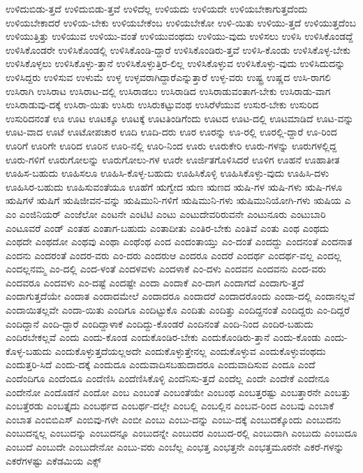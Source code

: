 {ಉಳಿದುಬಿಡು-ತ್ತದೆ
ಉಳಿದುಬಿಡು-ತ್ತವೆ
ಉಳಿದೆಲ್ಲ
ಉಳಿಯದು
ಉಳಿಯದೇ
ಉಳಿಯಬೇಕಾಗುತ್ತದೆಂದು
ಉಳಿಯಬೇಕಾದರೆ
ಉಳಿಯ-ಬೇಕು
ಉಳಿಯಬೇಕೆಂಬ
ಉಳಿಯಬೇಕೋ
ಉಳಿ-ಯಿತು
ಉಳಿಯು-ತ್ತದೆ
ಉಳಿಯುತ್ತದೆಂಬ
ಉಳಿಯುತ್ತಿತ್ತು
ಉಳಿಯುವ
ಉಳಿಯು-ವಂತೆ
ಉಳಿಯುವಂಥದು
ಉಳಿಯು-ವುದು
ಉಳಿಸಲು
ಉಳಿಸಿ
ಉಳಿಸಿಕೊಂಡದ್ದೆ
ಉಳಿಸಿಕೊಂಡರೇ
ಉಳಿಸಿಕೊಂಡಲ್ಲಿ
ಉಳಿಸಿಕೊಂಡಿ-ದ್ದಾರೆ
ಉಳಿಸಿಕೊಂಡಿರು-ತ್ತವೆ
ಉಳಿಸಿ-ಕೊಂಡು
ಉಳಿಸಿಕೊಳ್ಳ-ಬೇಕು
ಉಳಿಸಿಕೊಳ್ಳಲು
ಉಳಿಸಿಕೊಳ್ಳು-ತ್ತಾನೆ
ಉಳಿಸಿಕೊಳ್ಳುತ್ತಿರ-ಲಿಲ್ಲ
ಉಳಿಸಿಕೊಳ್ಳುವ
ಉಳಿಸಿಕೊಳ್ಳು-ವುದು
ಉಳಿಸಿದುದನ್ನು
ಉಳಿಸಿದ್ದರು
ಉಳಿಸುವ
ಉಳುಮೆ
ಉಳ್ಳ
ಉಳ್ಳವರಾಗಿದ್ದಾರೆಎನ್ನುತ್ತಾರೆ
ಉಳ್ಳ-ವರು
ಉಷ್ಟ್ರ
ಉಷ್ಣದ
ಉಸಿ-ರಾಗಲಿ
ಉಸಿರಾಗಿ
ಉಸಿರಾಟ
ಉಸಿರಾಟ-ದಲ್ಲಿ
ಉಸಿರಾಡಲು
ಉಸಿರಾಡಿದ
ಉಸಿರಾಡುವಂತಾಗ-ಬೇಕು
ಉಸಿರಾಡು-ವಾಗ
ಉಸಿರಾಡುವು-ದಕ್ಕೆ
ಉಸಿರಾ-ಯಿತು
ಉಸಿರು
ಉಸಿರುಕಟ್ಟುವಂಥ
ಉಸಿರೆಳೆಯುವ
ಉಸುರ-ಬೇಕು
ಉಸುರಿದ
ಉಸುರಿದನಂತೆ
ಊ
ಊಟ
ಊಟಕ್ಕೂ
ಊಟಕ್ಕೆ
ಊಟತಿಂಡಿಗೆಂದು
ಊಟದ
ಊಟ-ದಲ್ಲಿ
ಊಟಮಾಡಿದೆ
ಊಟ-ವನ್ನು
ಊಟ-ವಾದ
ಊಟೆ
ಊಟೋಪಚಾರ
ಊದಿ
ಊದಿ-ದರು
ಊರ
ಊರನ್ನು
ಊ-ರಲ್ಲಿ
ಊರಲ್ಲಿ-ದ್ದಾರೆ
ಊ-ರಿಂದ
ಊರಿಗೆ
ಊರಿಗೇ
ಊರಿದ
ಊರಿನ
ಊರಿ-ನಲ್ಲಿ
ಊರಿ-ನಿಂದ
ಊರು
ಊರುಕೇರಿ
ಊರು-ಗಳನ್ನು
ಊರುಗಳಲ್ಲಿದ್ದ
ಊರು-ಗಳಿಗೆ
ಊರುಗೋಲನ್ನು
ಊರುಗೋಲು-ಗಳ
ಊರೇ
ಊರ್ಜಿತಗೊಳಿಸಿದರೆ
ಊಳಿಗ
ಊಹನೆ
ಊಹಾತೀತ
ಊಹಿಸ-ಬಹುದು
ಊಹಿಸಲೂ
ಊಹಿಸಿ-ಕೊಳ್ಳ-ಬಹುದು
ಊಹಿಸಿಕೊಳ್ಳಿ
ಊಹಿಸಿಕೊಳ್ಳು-ವುದು
ಊಹಿಸಿ-ದಳು
ಊಹಿಸಿರ-ಬಹುದು
ಊಹಿಸುವಂತೆಯೂ
ಊಹೆಗೆ
ಋಗ್ವೇದ
ಋಣ
ಋಣದ
ಋಷಿ-ಗಳ
ಋಷಿ-ಗಳು
ಋಷಿ-ಗಳೂ
ಋಷಿಗಳೆ
ಋಷಿಗೆ
ಋಷಿಜೀವನ-ವನ್ನು
ಋಷಿಮುನಿ-ಗಳಿಗೆ
ಋಷಿಮುನಿ-ಗಳು
ಋಷಿಮುನಿಯೋಗಿ-ಗಳು
ಋಷಿಯ
ಎ
ಎಂ
ಎಂಜಿನಿಯರ್
ಎಂಜೆಲೋ
ಎಂಟನೇ
ಎಂಟಿಟಿ
ಎಂಟು
ಎಂಟುದೇವರಿರುವನೇ
ಎಂಟುನೂರು
ಎಂಟುಬಾರಿ
ಎಂಟೂವರೆ
ಎಂಡ್
ಎಂತಹ
ಎಂತಾಗ-ಬಹುದು
ಎಂತಾದೀತು
ಎಂತಿರ-ಬೇಕು
ಎಂತಿವೆ
ಎಂತು
ಎಂಥ
ಎಂಥದು
ಎಂಥದೇ
ಎಂಥದೋ
ಎಂಥವು
ಎಂಥಾ
ಎಂಥೆಂಥ
ಎಂದ
ಎಂದಂತಾಯ್ತು
ಎಂ-ದಂತೆ
ಎಂದದ್ದು
ಎಂದನಂತೆ
ಎಂದನಾತ
ಎಂದನು
ಎಂದರಂತೆ
ಎಂದರ-ವರು
ಎಂ-ದರು
ಎಂದರುಆ
ಎಂದರೂ
ಎಂದರೆ
ಎಂದರ್ಥ
ಎಂದರ್ಥ-ವಲ್ಲ
ಎಂದಲ್ಲ
ಎಂದಲ್ಲನಮ್ಮ
ಎಂ-ದಲ್ಲಿ
ಎಂದ-ಳಂತೆ
ಎಂದಳವಳು
ಎಂದಳಾಕೆ
ಎಂ-ದಳು
ಎಂದವನ
ಎಂದವನು
ಎಂದ-ವರು
ಎಂದವರೂ
ಎಂದವಳು
ಎಂ-ದಷ್ಟೆ
ಎಂದಷ್ಟೇ
ಎಂದಾ
ಎಂದಾಕೆ
ಎಂ-ದಾಗ
ಎಂದಾಗದೆ
ಎಂದಾಗು-ತ್ತದೆ
ಎಂದಾಗುತ್ತದೆಯೇ
ಎಂದಾತ
ಎಂದಾದಮೇಲೆ
ಎಂದಾದರೂ
ಎಂದಾದರೆ
ಎಂದಾದರೊಂದು
ಎಂದಾ-ದಲ್ಲಿ
ಎಂದಾನಲ್ಲವೆ
ಎಂದಾಯಿತಲ್ಲವೇ
ಎಂದಾ-ಯಿತು
ಎಂದಿಗೂ
ಎಂದಿಟ್ಟುಕೊ
ಎಂದಿತು
ಎಂದಿತ್ತು
ಎಂದಿದ್ದನಂತೆ
ಎಂದಿದ್ದರು
ಎಂ-ದಿದ್ದರೆ
ಎಂದಿದ್ದಾನೆ
ಎಂದಿ-ದ್ದಾರೆ
ಎಂದಿದ್ದಾಳಾಕೆ
ಎಂದಿದ್ದು-ಕೊಂಡರೆ
ಎಂದಿನಂತೆ
ಎಂದಿ-ನಿಂದ
ಎಂದಿರ-ಬಹುದು
ಎಂದಿರಬೇಕಲ್ಲವೆ
ಎಂದು
ಎಂದು-ಕೊಂಡ
ಎಂದುಕೊಂಡಿರ-ಬೇಕು
ಎಂದುಕೊಂಡಿರು-ತ್ತಾನೆ
ಎಂದು-ಕೊಂಡು
ಎಂದು-ಕೊಳ್ಳ-ಬಹುದು
ಎಂದುಕೊಳ್ಳುತ್ತದೆಯಲ್ಲಅದೇ
ಎಂದುಕೊಳ್ಳುತ್ತೇನಲ್ಲ
ಎಂದುಕೊಳ್ಳುವ
ಎಂದುಕೊಳ್ಳುವಂಥದು
ಎಂದುತ್ತರಿ-ಸಿದೆ
ಎಂದು-ದಕ್ಕೆ
ಎಂದುದೂ
ಎಂದುವಾದಿಸಬಹುದಾದರೂ
ಎಂದುವಾದಿಸುವ
ಎಂದೂ
ಎಂದೆ
ಎಂದೆಂದಿಗೂ
ಎಂದೆಂದೂ
ಎಂದೆಣಿಸಿ
ಎಂದೆಣಿಸಿಕೊಳ್ಳಿ
ಎಂದೆನಿಸು-ತ್ತದೆ
ಎಂದೆಲ್ಲ
ಎಂದೇ
ಎಂದೇಕೆ
ಎಂದೇನೂ
ಎಂದೇನೋ
ಎಂದೊಡನೆ
ಎಂದೋ
ಎಂಬ
ಎಂಬಂತೆ
ಎಂಬಂತೆಯೇ
ಎಂಬಂಥ
ಎಂಬತ್ತರಷ್ಟು
ಎಂಬತ್ತಾರನೇ
ಎಂಬತ್ತು
ಎಂಬತ್ತೆರಡು
ಎಂಬತ್ತೈದು
ಎಂಬರ್ಥದ
ಎಂಬರ್ಥ-ದಲ್ಲೇ
ಎಂಬಲ್ಲಿ
ಎಂಬಲ್ಲಿನ
ಎಂಬವ-ರಿಂದ
ಎಂಬವು
ಎಂಬಾಕೆ
ಎಂಬಾತ
ಎಂಬಿಬಿಎಸ್
ಎಂಬಿವು-ಗಳೇ
ಎಂಬೀ
ಎಂಬು
ಎಂಬು-ದನ್ನು
ಎಂಬು-ದಕ್ಕೆ
ಎಂಬುದಕ್ಕೊಂದು
ಎಂಬುದನು
ಎಂಬುದನ್ನಲ್ಲ
ಎಂಬುದನ್ನು
ಎಂಬುದನ್ನೂ
ಎಂಬುದನ್ನೇ
ಎಂಬುದರ
ಎಂಬುದ-ರಲ್ಲಿ
ಎಂಬುದಾಗಿ
ಎಂಬುದು
ಎಂಬುದೂ
ಎಂಬುದೆ
ಎಂಬುದೇ
ಎಂಬುದೇನೋ
ಎಂಬು-ವರು
ಎಂಬೆಲ್ಲ
ಎಂಭತ್ತ
ಎಂಭತ್ತನೇ
ಎಂಭತ್ತಮೂರನೇ
ಎಕರೆ-ಗಳನ್ನು
ಎಕರೆಗಳಷ್ಟು
ಎಕೆಡಮಿಯ
ಎಕ್ಸ್
}
